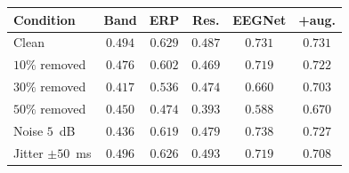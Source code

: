 \begin{tabular}{lccccc}
\toprule
Condition & Band & ERP & Res. & EEGNet & +aug. \\
\midrule
Clean & $0.494$ & $0.629$ & $0.487$ & $0.731$ & $0.731$ \\
$10\%$ removed & $0.476$ & $0.602$ & $0.469$ & $0.719$ & $0.722$ \\
$30\%$ removed & $0.417$ & $0.536$ & $0.474$ & $0.660$ & $0.703$ \\
$50\%$ removed & $0.450$ & $0.474$ & $0.393$ & $0.588$ & $0.670$ \\
Noise $5$~dB & $0.436$ & $0.619$ & $0.479$ & $0.738$ & $0.727$ \\
Jitter $\pm50$~ms & $0.496$ & $0.626$ & $0.493$ & $0.719$ & $0.708$ \\
\bottomrule
\end{tabular}
